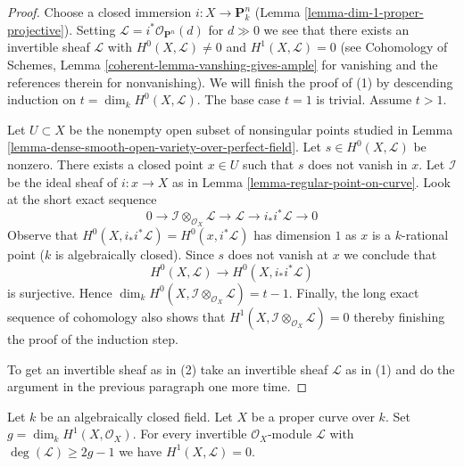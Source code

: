 \begin{proof}
Choose a closed immersion $i : X \to \mathbf{P}^n_k$
(Lemma \ref{lemma-dim-1-proper-projective}).
Setting $\mathcal{L} = i^*\mathcal{O}_{\mathbf{P}^n}(d)$
for $d \gg 0$ we see that there exists an invertible sheaf
$\mathcal{L}$ with $H^0(X, \mathcal{L}) \not = 0$ and
$H^1(X, \mathcal{L}) = 0$ (see
Cohomology of Schemes, Lemma \ref{coherent-lemma-vanshing-gives-ample}
for vanishing and the references therein for nonvanishing).
We will finish the proof of (1) by descending induction on
$t = \dim_k H^0(X, \mathcal{L})$. The base case $t = 1$ is trivial.
Assume $t > 1$.

\medskip\noindent
Let $U \subset X$ be the nonempty open subset of nonsingular points
studied in Lemma \ref{lemma-dense-smooth-open-variety-over-perfect-field}.
Let $s \in H^0(X, \mathcal{L})$ be nonzero. There exists a closed
point $x \in U$ such that $s$ does not vanish in $x$. Let $\mathcal{I}$
be the ideal sheaf of $i : x \to X$ as in
Lemma \ref{lemma-regular-point-on-curve}. Look at the
short exact sequence
$$
0 \to \mathcal{I} \otimes_{\mathcal{O}_X} \mathcal{L} \to
\mathcal{L} \to i_*i^*\mathcal{L} \to 0
$$
Observe that $H^0(X, i_*i^*\mathcal{L}) = H^0(x, i^*\mathcal{L})$
has dimension $1$ as $x$ is a $k$-rational point ($k$ is algebraically
closed). Since $s$ does not vanish at $x$ we conclude that
$$
H^0(X, \mathcal{L}) \longrightarrow H^0(X, i_*i^*\mathcal{L})
$$
is surjective. Hence
$\dim_k H^0(X, \mathcal{I} \otimes_{\mathcal{O}_X} \mathcal{L}) = t - 1$.
Finally, the long exact sequence of cohomology also shows that
$H^1(X, \mathcal{I} \otimes_{\mathcal{O}_X} \mathcal{L}) = 0$
thereby finishing the proof of the induction step.

\medskip\noindent
To get an invertible sheaf as in (2) take an invertible sheaf
$\mathcal{L}$ as in (1) and do the argument in the previous paragraph
one more time.
\end{proof}

\begin{lemma}
\label{lemma-vanishing-degree-2g-and-1-line-bundle}
Let $k$ be an algebraically closed field. Let $X$ be a proper curve over $k$.
Set $g = \dim_k H^1(X, \mathcal{O}_X)$. For every invertible
$\mathcal{O}_X$-module $\mathcal{L}$ with $\deg(\mathcal{L}) \geq 2g - 1$
we have $H^1(X, \mathcal{L}) = 0$.
\end{lemma}


